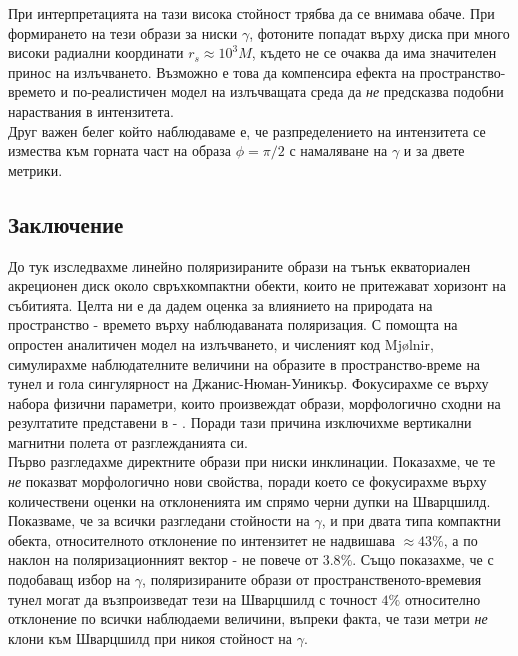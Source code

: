 \documentclass[12pt]{article}
\numberwithin{equation}{section}
\numberwithin{figure}{section}
\begin{document}
	При интерпретацията на тази висока стойност трябва да се внимава обаче. При формирането на тези образи за ниски $\gamma$, фотоните попадат върху диска при много високи радиални координати $r_s\approx 10^3M$, където не се очаква да има значителен принос на излъчването. Възможно е това да компенсира ефекта на пространство-времето и по-реалистичен модел на излъчващата среда да \emph{не} предсказва подобни нараствания в интензитета. \\
	
	Друг важен белег който наблюдаваме е, че разпределението на интензитета се измества към горната част на образа $\phi = \pi / 2$ с намаляване на $\gamma$ и за двете метрики.
	
	 \subsection{Заключение}
	
	До тук изследвахме линейно поляризираните образи на тънък екваториален акреционен диск около свръхкомпактни обекти, които не притежават хоризонт на събитията. Целта ни е да дадем оценка за влиянието на природата на пространство - времето върху наблюдаваната поляризация. С помощта на опростен аналитичен модел на излъчването, и численият код Mjølnir, симулирахме наблюдателните величини на образите в пространство-време на тунел и гола сингулярност на Джанис-Нюман-Уиникър. Фокусирахме се върху набора физични параметри, които произвеждат образи, морфологично сходни на резултатите представени в \cite{EHT_M87_I} - \cite{EHT_M87_VIII}. Поради тази причина изключихме вертикални магнитни полета от разглежданията си.\\
	
	Първо разгледахме директните образи при ниски инклинации. Показахме, че те \emph{не} показват морфологично нови свойства, поради което се фокусирахме върху количествени оценки на отклоненията им спрямо черни дупки на Шварцшилд. Показваме, че за всички разгледани стойности на $\gamma$, и при двата типа компактни обекта, относителното отклонение по интензитет не надвишава $\approx 43\%$, а по наклон на поляризационният вектор - не повече от $3.8\%$. Също показахме, че с подобаващ избор на $\gamma$, поляризираните образи от пространственото-времевия тунел могат да възпроизведат тези на Шварцшилд с точност $4\%$ относително отклонение по всички наблюдаеми величини, въпреки факта, че тази метри \emph{не} клони към Шварцшилд при никоя стойност на $\gamma$. \\
	
\end{document}
